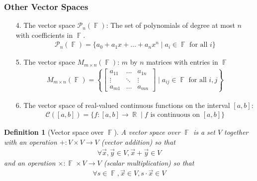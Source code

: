 \documentclass[10pt]{article}
\DeclareMathOperator{\R}{{\mathbb{R}}}
\DeclareMathOperator{\F}{{\mathbb{F}}}
\theoremstyle{break}
\newtheorem{defn}{Definition}[subsection]
\begin{document}
\subsubsection{Other Vector Spaces}
\begin{enumerate}
    \item[4.] The vector space $\mathcal{P}_n(\F)$: The set of polynomials of degree at most $n$ with coefficients in $\F$.
        \begin{align*}
            \mathcal{P}_n(\F) = \{a_0 + a_1x + \dots + a_nx^n \mid a_i \in \F \text{ for all } i\}
        \end{align*}
    \item[5.] The vector space $M_{m \times n}(\F)$: $m$ by $n$ matrices with entries in $\F$
        \begin{align*}
            M_{m \times n}(\F) = \left\{\begin{bmatrix} a_{11} & \dots & a_{1n} \\ \vdots & \ddots & \vdots \\ a_{m1} & \dots & a_{mn} \end{bmatrix} \mid a_{ij} \in \F \text{ for all } i, j \right\}
        \end{align*}
    \item[6.] The vector space of real-valued continuous functions on the interval $[a,b]$:
        \begin{align*}
            \mathcal{C}([a,b]) = \{f:[a, b] \to \R \mid f \text{ is continuous on }[a, b]\}
        \end{align*}
\end{enumerate}
\begin{defn}[Vector space over $\F$]
    A vector space over $\F$ is a set $V$ together with an operation $+: V \times V \to V$ (vector addition) so that 
    \begin{align*}
        \forall \vec{x}, \vec{y} \in V, \vec{x} + \vec{y} \in V
    \end{align*}
    and an operation $\times: \F \times V \to V$ (scalar multiplication) so that 
    \begin{align*}
        \forall s \in \F, \vec{x} \in V, s \cdot \vec{x} \in V
    \end{align*}
\end{defn}
\end{document}
